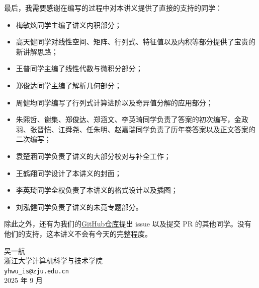 最后，我需要感谢在编写的过程中对本讲义提供了直接的支持的同学：
\begin{itemize}
    \item 梅敏炫同学主编了讲义内积部分；
    \item 高天健同学对线性空间、矩阵、行列式、特征值以及内积等部分提供了宝贵的新讲解思路；
    \item 王普同学主编了线性代数与微积分部分；
    \item 郑俊达同学主编了解析几何部分；
    \item 周健均同学编写了行列式计算进阶以及奇异值分解的应用部分；
    \item 朱熙哲、谢集、郑俊达、郑涵文、李英琦同学负责了答案的初次编写，金政羽、张晋恺、江舜尧、任朱明、赵嘉瑞同学负责了历年卷答案以及正文答案的二次编写；
    \item 袁楚涵同学负责了讲义的大部分校对与补全工作；
    \item 王鹤翔同学设计了本讲义的封面；
    \item 李英琦同学全权负责了本讲义的格式设计以及插图；
    \item 刘泓健同学负责了讲义的未竟专题部分。
\end{itemize}
除此之外，还有为我们的\href{https://github.com/yhwu-is/Linear-Algebra-Left-Undone}{GitHub仓库}提出 issue 以及提交 PR 的其他同学。没有他们的支持，这本讲义不会有今天的完整程度。

\begin{flushright}
    \kaishu
    吴一航 \\
    浙江大学计算机科学与技术学院 \\
    \verb|yhwu_is@zju.edu.cn| \\
    2025 年 9 月
\end{flushright}
